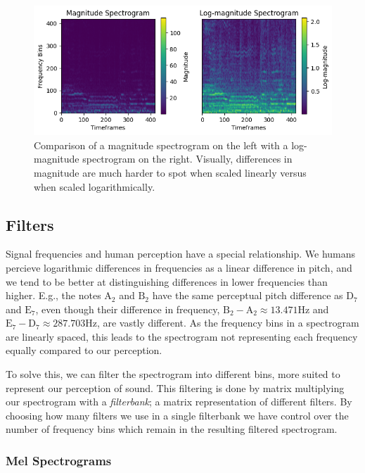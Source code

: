 \begin{figure}[H]
    \centering
    \hspace*{-1.0cm}
    \includegraphics[scale=1.0]{figures/spectrogramlogspectrogram}
    \caption{Comparison of a magnitude spectrogram on the left with a log-magnitude spectrogram on the right. Visually, differences in magnitude are much harder to spot when scaled linearly versus when scaled logarithmically.}
    \label{SpectrogramLogspectrogramFigure}
\end{figure}

\subsection{Filters}

Signal frequencies and human perception have a special relationship. We humans percieve logarithmic differences in frequencies as a linear difference in pitch, and we tend to be better at distinguishing differences in lower frequencies than higher. E.g., the notes $\text{A}_2$ and $\text{B}_2$ have the same perceptual pitch difference as $\text{D}_7$ and $\text{E}_7$, even though their difference in frequency, $\text{B}_2 - \text{A}_2 \approx 13.471 \text{Hz}$ and $\text{E}_7 - \text{D}_7 \approx 287.703 \text{Hz}$, are vastly different. As the frequency bins in a spectrogram are linearly spaced, this leads to the spectrogram not representing each frequency equally compared to our perception.

To solve this, we can filter the spectrogram into different bins, more suited to represent our perception of sound. This filtering is done by matrix multiplying our spectrogram with a \textit{filterbank}; a matrix representation of different filters. By choosing how many filters we use in a single filterbank we have control over the number of frequency bins which remain in the resulting filtered spectrogram.

\subsubsection{Mel Spectrograms}

